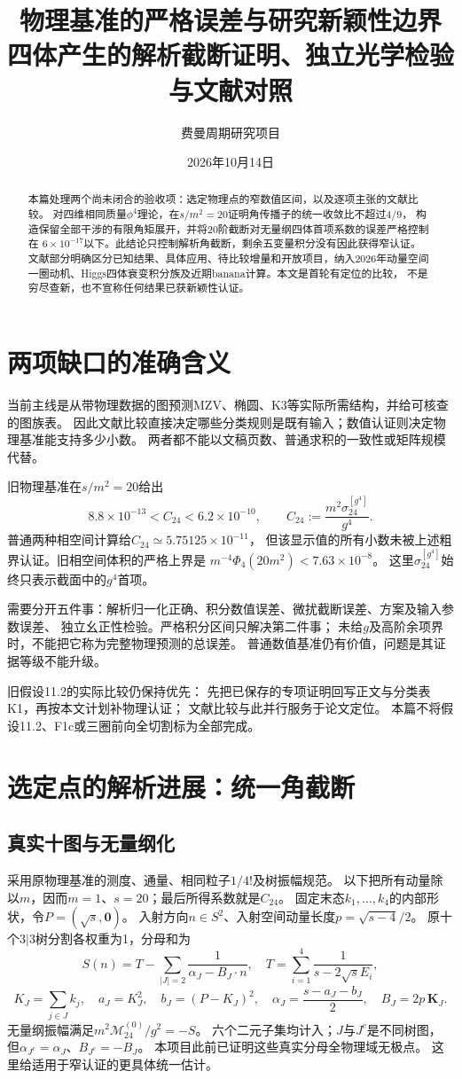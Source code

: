 \documentclass[11pt,a4paper]{ctexart}
\title{物理基准的严格误差与研究新颖性边界\\[5pt]
\large 四体产生的解析截断证明、独立光学检验与文献对照}
\author{费曼周期研究项目}
\date{2026年10月14日}
\theoremstyle{cnplain}\newtheorem{proposition}{命题}[section]
\begin{document}
\maketitle
\begin{abstract}
本篇处理两个尚未闭合的验收项：选定物理点的窄数值区间，以及逐项主张的文献比较。
对四维相同质量$\phi^4$理论，在$s/m^2=20$证明角传播子的统一收敛比不超过$4/9$，
构造保留全部干涉的有限角矩展开，并将20阶截断对无量纲四体首项系数的误差严格控制在
$6\times10^{-17}$以下。此结论只控制解析角截断，剩余五变量积分没有因此获得窄认证。
文献部分明确区分已知结果、具体应用、待比较增量和开放项目，纳入2026年动量空间
一圈动机、Higgs四体衰变积分族及近期banana计算。本文是首轮有定位的比较，
不是穷尽查新，也不宣称任何结果已获新颖性认证。
\end{abstract}
\tableofcontents
\clearpage

\section{两项缺口的准确含义}
当前主线是从带物理数据的图预测MZV、椭圆、K3等实际所需结构，并给可核查的图族表。
因此文献比较直接决定哪些分类规则是既有输入；数值认证则决定物理基准能支持多少小数。
两者都不能以文稿页数、普通求积的一致性或矩阵规模代替。

旧物理基准在$s/m^2=20$给出
\[
 8.8\times10^{-13}<C_{24}<6.2\times10^{-10},
 \qquad C_{24}:=\frac{m^2\sigma_{24}^{[g^4]}}{g^4}.
\]
普通两种相空间计算给$C_{24}\simeq5.75125\times10^{-11}$，
但该显示值的所有小数未被上述粗界认证。旧相空间体积的严格上界是
$m^{-4}\Phi_4(20m^2)<7.63\times10^{-8}$。
这里$\sigma_{24}^{[g^4]}$始终只表示截面中的$g^4$首项。

需要分开五件事：解析归一化正确、积分数值误差、微扰截断误差、方案及输入参数误差、
独立幺正性检验。严格积分区间只解决第二件事；
未给$g$及高阶余项界时，不能把它称为完整物理预测的总误差。
普通数值基准仍有价值，问题是其证据等级不能升级。

旧假设11.2的实际比较仍保持优先：
先把已保存的专项证明回写正文与分类表K1，再按本文计划补物理认证；
文献比较与此并行服务于论文定位。
本篇不将假设11.2、F1c或三圈前向全切割标为全部完成。

\section{选定点的解析进展：统一角截断}
\subsection{真实十图与无量纲化}
采用原物理基准的测度、通量、相同粒子$1/4!$及树振幅规范。
以下把所有动量除以$m$，因而$m=1$、$s=20$；最后所得系数就是$C_{24}$。
固定末态$k_1,\ldots,k_4$的内部形状，令$P=(\sqrt s,\mathbf0)$。
入射方向$n\in S^2$、入射空间动量长度$p=\sqrt{s-4}/2$。
原十个$3|3$树分割各权重为1，分母和为
\[
 S(n)=T-\sum_{|J|=2}\frac1{\alpha_J-B_J\cdot n},
 \quad
 T=\sum_{i=1}^4\frac1{s-2\sqrt s E_i},
\]
\[
 K_J=\sum_{j\in J}k_j,\quad a_J=K_J^2,\quad
 b_J=(P-K_J)^2,\quad
 \alpha_J=\frac{s-a_J-b_J}{2},\quad B_J=2p\,\mathbf K_J.
\]
无量纲振幅满足$m^2\mathcal M_{24}^{(0)}/g^2=-S$。
六个二元子集均计入；$J$与$J^c$是不同树图，
但$\alpha_{J^c}=\alpha_J$、$B_{J^c}=-B_J$。
本项目此前已证明这些真实分母全物理域无极点。
这里给适用于窄认证的更具体统一估计。
\end{document}
